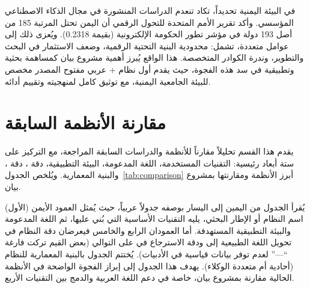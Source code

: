 في البيئة اليمنية تحديداً، تكاد تنعدم الدراسات المنشورة في مجال الذكاء
الاصطناعي المؤسسي. وأكد تقرير الأمم المتحدة للتحول الرقمي
\cite{un2024egd} أن اليمن تحتل المرتبة 185 من أصل 193 دولة في مؤشر تطور
الحكومة الإلكترونية (بقيمة 0.2318). ويُعزى ذلك إلى عوامل متعددة، تشمل: محدودية البنية التحتية
الرقمية، وضعف الاستثمار في البحث والتطوير، وندرة الكوادر المتخصصة. هذا الواقع
يُبرز أهمية مشروع بيان كمساهمة بحثية وتطبيقية في سد هذه الفجوة، حيث يقدم
أول نظام + عربي مفتوح المصدر مخصص للبيئة الجامعية
اليمنية، مع توثيق كامل لمنهجيته وتقييم أدائه.

\section{مقارنة الأنظمة السابقة}
\label{sec:comparison}

يقدم هذا القسم تحليلاً مقارناً للأنظمة والدراسات السابقة المراجعة، مع التركيز
على ستة أبعاد رئيسية: التقنيات المستخدمة، اللغة المدعومة، البيئة التطبيقية،
دقة ، دقة ، والبنية المعمارية. ويُلخص
الجدول~\ref{tab:comparison} أبرز الأنظمة ومقارنتها بمشروع بيان.

يُقرأ الجدول من اليمين إلى اليسار بوصفه جدولاً عربياً، حيث يُمثل العمود
الأيمن (الأول) اسم النظام أو
الإطار البحثي، يليه التقنيات الأساسية التي بُني عليها، ثم اللغة المدعومة
والبيئة التطبيقية المستهدفة. أما العمودان الرابع والخامس فيعرضان دقة
النظام في تحويل اللغة الطبيعية إلى  ودقة الاسترجاع في 
على التوالي (بعض القيم تركت فارغة ``---'' لعدم توفر بيانات قياسية في
الأدبيات). يُختتم الجدول بالبنية المعمارية للنظام (أحادية أم متعددة
الوكلاء). يهدف هذا الجدول إلى إبراز الفجوة الواضحة في الأنظمة الحالية
مقارنة بمشروع بيان، خاصة في دعم اللغة العربية والدمج بين التقنيات الأربع.

